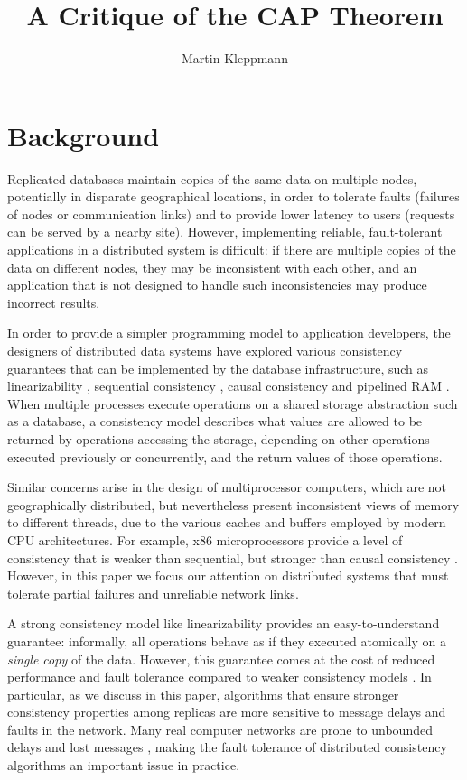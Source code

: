 \documentclass[fleqn,12pt,lineno]{wlpeerj} %
\title{A Critique of the CAP Theorem}
\author[1]{Martin Kleppmann}
\affil[1]{University of Cambridge Computer Laboratory, Cambridge, UK}
\begin{document}
\flushbottom
\maketitle
\thispagestyle{empty}

\section{Background}

Replicated databases maintain copies of the same data on multiple nodes, potentially in disparate
geographical locations, in order to tolerate faults (failures of nodes or communication links) and
to provide lower latency to users (requests can be served by a nearby site). However, implementing
reliable, fault-tolerant applications in a distributed system is difficult: if there are multiple
copies of the data on different nodes, they may be inconsistent with each other, and an application
that is not designed to handle such inconsistencies may produce incorrect results.

In order to provide a simpler programming model to application developers, the designers of
distributed data systems have explored various consistency guarantees that can be implemented by the
database infrastructure, such as linearizability \citep{Herlihy1990jq}, sequential
consistency \citep{Lamport1979ky}, causal consistency \citep{Ahamad1995gl} and pipelined RAM
\citep[PRAM, see][]{Lipton1988uh}. When multiple processes execute operations on a shared storage
abstraction such as a database, a consistency model describes what values are allowed to be returned
by operations accessing the storage, depending on other operations executed previously or
concurrently, and the return values of those operations.

Similar concerns arise in the design of multiprocessor computers, which are not geographically
distributed, but nevertheless present inconsistent views of memory to different threads, due to the
various caches and buffers employed by modern CPU architectures. For example, x86 microprocessors
provide a level of consistency that is weaker than sequential, but stronger than causal
consistency \citep{Sewell2010fj}. However, in this paper we focus our attention on distributed
systems that must tolerate partial failures and unreliable network links.

A strong consistency model like linearizability provides an easy-to-understand guarantee:
informally, all operations behave as if they executed atomically on a \emph{single copy} of the
data. However, this guarantee comes at the cost of reduced performance and fault tolerance
compared to weaker consistency models \citep{Attiya1994gw,Davidson1985hv}. In particular, as we discuss
in this paper, algorithms that ensure stronger consistency properties among replicas are more
sensitive to message delays and faults in the network. Many real computer networks are prone to
unbounded delays and lost messages \citep{Bailis2014jx}, making the fault tolerance of distributed
consistency algorithms an important issue in practice.
\end{document}
